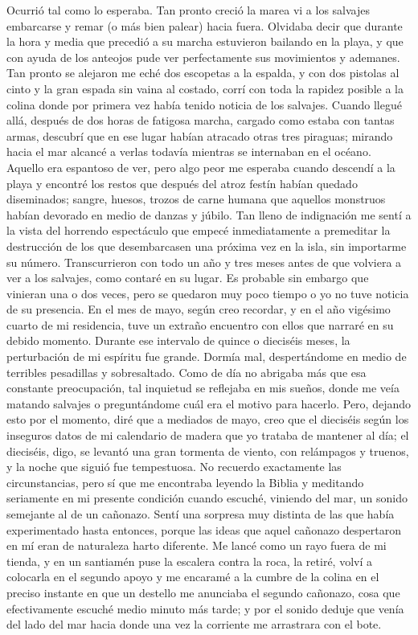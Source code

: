 \documentclass{novela}
\begin{document}
    Ocurrió tal como lo esperaba. Tan pronto creció la marea vi a los salvajes embarcarse y remar (o más bien palear) hacia fuera. Olvidaba decir que durante la hora y media que precedió a su marcha estuvieron bailando en la playa, y que con ayuda de los anteojos pude ver perfectamente sus movimientos y ademanes.
    Tan pronto se alejaron me eché dos escopetas a la espalda, y con dos pistolas al cinto y la gran espada sin vaina al costado, corrí con toda la rapidez posible a la colina donde por primera vez había tenido noticia de los salvajes. Cuando llegué allá, después de dos horas de fatigosa marcha, cargado como estaba con tantas armas, descubrí que en ese lugar habían atracado otras tres piraguas; mirando hacia el mar alcancé a verlas todavía mientras se internaban en el océano.
    Aquello era espantoso de ver, pero algo peor me esperaba cuando descendí a la playa y encontré los restos que después del atroz festín habían quedado diseminados; sangre, huesos, trozos de carne humana que aquellos monstruos habían devorado en medio de danzas y júbilo. Tan lleno de indignación me sentí a la vista del horrendo espectáculo que empecé inmediatamente a premeditar la destrucción de los que desembarcasen una próxima vez en la isla, sin importarme su número.
    Transcurrieron con todo un año y tres meses antes de que volviera a ver a los salvajes, como contaré en su lugar. Es probable sin embargo que vinieran una o dos veces, pero se quedaron muy poco tiempo o yo no tuve noticia de su presencia. En el mes de mayo, según creo recordar, y en el año vigésimo cuarto de mi residencia, tuve un extraño encuentro con ellos que narraré en su debido momento.
    Durante ese intervalo de quince o dieciséis meses, la perturbación de mi espíritu fue grande. Dormía mal, despertándome en medio de terribles pesadillas y sobresaltado. Como de día no abrigaba más que esa constante preocupación, tal inquietud se reflejaba en mis sueños, donde me veía matando salvajes o preguntándome cuál era el motivo para hacerlo. Pero, dejando esto por el momento, diré que a mediados de mayo, creo que el dieciséis según los inseguros datos de mi calendario de madera que yo trataba de mantener al día; el dieciséis, digo, se levantó una gran tormenta de viento, con relámpagos y truenos, y la noche que siguió fue tempestuosa. No recuerdo exactamente las circunstancias, pero sí que me encontraba leyendo la Biblia y meditando seriamente en mi presente condición cuando escuché, viniendo del mar, un sonido semejante al de un cañonazo.
    Sentí una sorpresa muy distinta de las que había experimentado hasta entonces, porque las ideas que aquel cañonazo despertaron en mí eran de naturaleza harto diferente. Me lancé como un rayo fuera de mi tienda, y en un santiamén puse la escalera contra la roca, la retiré, volví a colocarla en el segundo apoyo y me encaramé a la cumbre de la colina en el preciso instante en que un destello me anunciaba el segundo cañonazo, cosa que efectivamente escuché medio minuto más tarde; y por el sonido deduje que venía del lado del mar hacia donde una vez la corriente me arrastrara con el bote.
\end{document}
